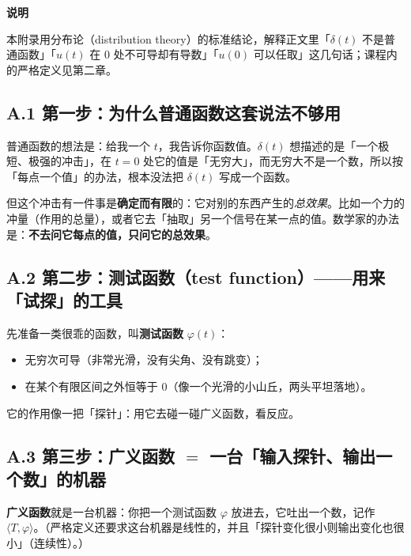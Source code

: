 \documentclass[UTF8,a4paper,11pt]{ctexart}
\newenvironment{note}{\begin{notebox}\textbf{说明}\par\smallskip}{\end{notebox}}
\newcounter{ex}[section]
\begin{document}
\begin{note}
本附录用分布论（distribution theory）的标准结论，解释正文里「$\delta(t)$ 不是普通函数」「$u(t)$ 在 $0$ 处不可导却有导数」「$u(0)$ 可以任取」这几句话；课程内的严格定义见第二章。
\end{note}

\subsection*{A.1 第一步：为什么普通函数这套说法不够用}
普通函数的想法是：给我一个 $t$，我告诉你函数值。$\delta(t)$ 想描述的是「一个极短、极强的冲击」，在 $t=0$ 处它的值是「无穷大」，而无穷大不是一个数，所以按「每点一个值」的办法，根本没法把 $\delta(t)$ 写成一个函数。

但这个冲击有一件事是\textbf{确定而有限}的：它对别的东西产生的\emph{总效果}。比如一个力的冲量（作用的总量），或者它去「抽取」另一个信号在某一点的值。数学家的办法是：\textbf{不去问它每点的值，只问它的总效果}。

\subsection*{A.2 第二步：测试函数（test function）——用来「试探」的工具}
先准备一类很乖的函数，叫\textbf{测试函数} $\varphi(t)$：
\begin{itemize}[nosep]
\item 无穷次可导（非常光滑，没有尖角、没有跳变）；
\item 在某个有限区间之外恒等于 $0$（像一个光滑的小山丘，两头平坦落地）。
\end{itemize}
它的作用像一把「探针」：用它去碰一碰广义函数，看反应。

\subsection*{A.3 第三步：广义函数 $=$ 一台「输入探针、输出一个数」的机器}
\textbf{广义函数}就是一台机器：你把一个测试函数 $\varphi$ 放进去，它吐出一个数，记作 $\langle T,\varphi\rangle$。（严格定义还要求这台机器是线性的，并且「探针变化很小则输出变化也很小」（连续性）。）
\end{document}
